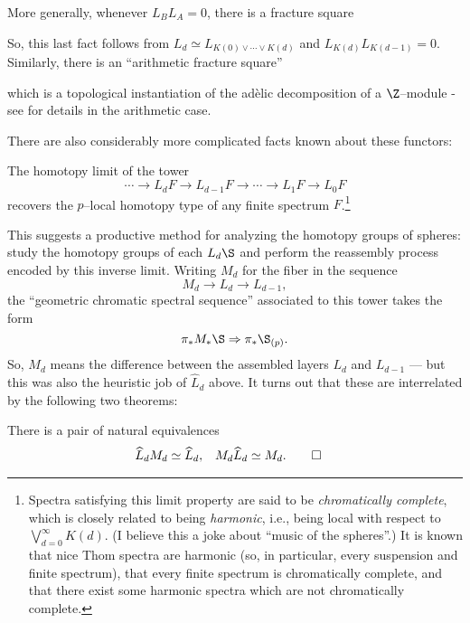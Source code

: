 \begin{remark}
More generally, whenever $L_B L_A = 0$, there is a fracture square
\begin{center}
\end{center}
So, this last fact follows from $L_d \simeq L_{K(0) \vee \cdots \vee K(d)}$ and $L_{K(d)} L_{K(d-1)} = 0$.  Similarly, there is an ``arithmetic fracture square''
\begin{center}
\end{center}
which is a topological instantiation of the ad\`elic decomposition of a $\Z$--module - see \cite{Bousfield} for details in the arithmetic case.
\end{remark}

There are also considerably more complicated facts known about these functors:
\begin{theorem}
The homotopy limit of the tower \[\cdots \to L_d F \to L_{d-1} F \to \cdots \to L_1 F \to L_0 F\] recovers the $p$--local homotopy type of any finite spectrum $F$.\footnote{Spectra satisfying this limit property are said to be \textit{chromatically complete}, which is closely related to being \textit{harmonic}, i.e., being local with respect to $\bigvee_{d=0}^\infty K(d)$.  (I believe this a joke about ``music of the spheres''.)  It is known that nice Thom spectra are harmonic (so, in particular, every suspension and finite spectrum), that every finite spectrum is chromatically complete, and that there exist some harmonic spectra which are not chromatically complete.}
\end{theorem}

\noindent This suggests a productive method for analyzing the homotopy groups of spheres: study the homotopy groups of each $L_d \S$ and perform the reassembly process encoded by this inverse limit.  Writing $M_d$ for the fiber in the sequence \[M_d \to L_d \to L_{d-1},\] the ``geometric chromatic spectral sequence'' associated to this tower takes the form \[\pi_* M_* \S \Rightarrow \pi_* \S_{(p)}.\]  So, $M_d$ means the difference between the assembled layers $L_d$ and $L_{d-1}$ --- but this was also the heuristic job of $\widehat L_d$ above.  It turns out that these are interrelated by the following two theorems:
\begin{theorem}
There is a pair of natural equivalences
\begin{align*}
\widehat L_d M_d & \simeq \widehat L_d, &
M_d \widehat L_d & \simeq M_d.
\qed
\end{align*}
\end{theorem}

